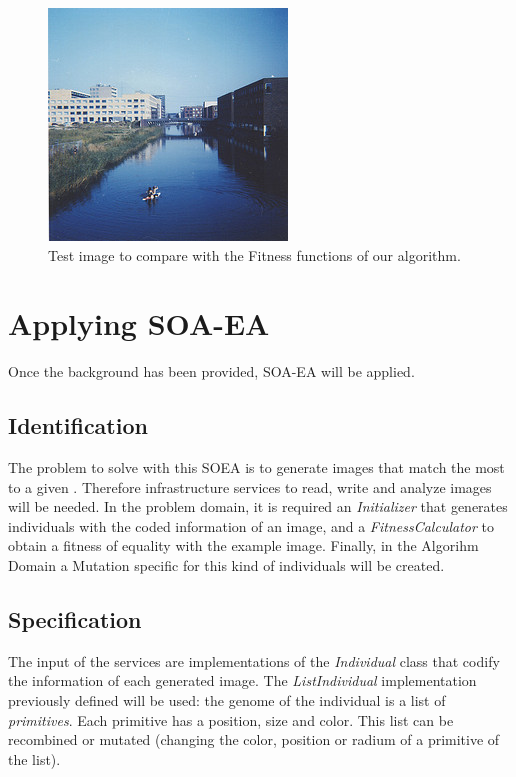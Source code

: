 \begin{figure}
\centering
   \includegraphics[scale =3] {gfx/art/flevopark.jpg}
\caption{Test image to compare with the Fitness functions of our algorithm.}
\label{fig:flevopark}
\end{figure}


\section{Applying SOA-EA}
\label{sec:art:soaea}

Once the background has been provided, SOA-EA will be applied.

\subsection{Identification}

The problem to solve with this SOEA is to generate images that match the most to a given . Therefore infrastructure services to read, write and analyze images will be needed. In the problem domain, it is required an {\em Initializer} that generates individuals with the coded information of an image, and a {\em FitnessCalculator} to obtain a fitness of equality with the example image. Finally, in the Algorihm Domain a Mutation specific for this kind of individuals will be created. 



\subsection{Specification}

The input of the services are implementations of the {\em Individual} class that codify the information of each generated image. The {\em ListIndividual}   implementation previously defined will be used: the genome of the individual is a list of
{\em primitives}. %
Each primitive has a position, size and color. This list can
be recombined or mutated (changing the color, position or radium of a
primitive of the list). 


